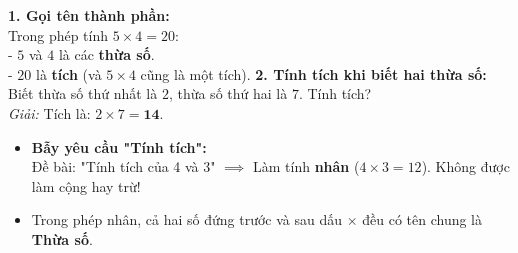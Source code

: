 \documentclass[11pt,a4paper]{article}
\begin{document}
\vspace{-1.5mm}
\noindent
\begin{minipage}[t]{0.49\textwidth}\vspace{0pt}
\begin{tcolorbox}[
  enhanced,
  colback=green!4!white,
  colframe=green!60!black,
  arc=2mm, boxrule=0.8pt,
  left=2mm, right=2mm, top=1.8mm, bottom=1.8mm,
  title={\footnotesize\bfseries\color{white}\faCheckCircle\ 4. Ví dụ thực hành chuẩn mực}
]
{\footnotesize
\textbf{1. Gọi tên thành phần:}\\
Trong phép tính $5 \times 4 = 20$:\\
- $5$ và $4$ là các \textbf{thừa số}.\\
- $20$ là \textbf{tích} (và $5 \times 4$ cũng là một tích).
\textbf{2. Tính tích khi biết hai thừa số:}\\
Biết thừa số thứ nhất là $2$, thừa số thứ hai là $7$. Tính tích?\\
\textit{Giải:} Tích là: $2 \times 7 = \mathbf{14}$.
}
\end{tcolorbox}
\end{minipage}
\hfill
\begin{minipage}[t]{0.49\textwidth}\vspace{0pt}
\begin{tcolorbox}[
  enhanced,
  colback=red!4!white,
  colframe=red!75!black,
  arc=2mm, boxrule=0.8pt,
  left=2mm, right=2mm, top=1.8mm, bottom=1.8mm,
  title={\footnotesize\bfseries\color{white}\faExclamationTriangle\ 5. Mẹo tránh bẫy trắc nghiệm}
]
{\footnotesize
\begin{itemize}\setlength{\itemsep}{1pt}\setlength{\leftskip}{-2.5mm}
  \item \textbf{Bẫy yêu cầu "Tính tích":}\\
  Đề bài: "Tính tích của 4 và 3" $\implies$ Làm tính \textbf{nhân} ($4 \times 3 = 12$). Không được làm cộng hay trừ!
  \item Trong phép nhân, cả hai số đứng trước và sau dấu $\times$ đều có tên chung là \textbf{Thừa số}.
\end{itemize}
}
\end{tcolorbox}
\end{minipage}
\end{document}
